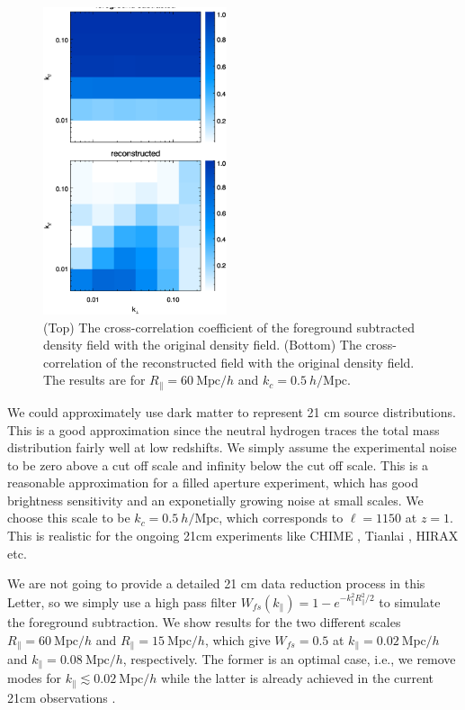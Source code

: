 \documentclass[aps,prl,twocolumn,showpacs,superscriptaddress,groupedaddress,nofootinbib,floatfix]{revtex4}  %
\newcommand{\mr}{\mathrm}
\begin{document}
\begin{figure}[tbp]
\begin{center}
\includegraphics[width=0.48\textwidth]{1.000cc2d.eps}
\end{center}
\vspace{-0.7cm}
\caption{(Top) The cross-correlation coefficient of the  
foreground subtracted density field with the original density field.
(Bottom) The cross-correlation of the reconstructed field with the original 
density field. 
The results are for $R_\parallel=60\ \mr{Mpc}/h$ and $k_c=0.5\ h/\mr{Mpc}$.}
\label{fig:ratio}
\end{figure}

We could approximately use dark matter to represent 21 cm source distributions.
This is a good approximation since the neutral hydrogen traces the total mass
distribution fairly well at low redshifts. We simply assume the experimental
noise to be zero above a cut off scale and infinity below the cut off scale.
This is a reasonable approximation for a filled aperture experiment, which
has good brightness sensitivity and an exponetially growing noise at small 
scales.
We choose this scale to be $k_c=0.5\ h/\mr{Mpc}$, which corresponds
to $\ell=1150$ at $z=1$. This is realistic for the ongoing 21cm experiments like
CHIME \cite{2014SPIE.9145E..22B}, Tianlai \cite{2015ApJ...798...40X}, 
HIRAX \cite{HIRAX} etc.

We are not going to provide a detailed 21 cm data reduction process in this 
Letter, so we simply  use a high pass filter 
$W_{fs}(k_\parallel)=1-e^{-k_\parallel^2R_\parallel^2/2}$ to simulate the 
foreground subtraction. We show results for the two different scales 
$R_\parallel=60\ \mr{Mpc}/h$ and $R_\parallel=15\ \mr{Mpc}/h$, which give
$W_{fs}=0.5$ at $k_\parallel=0.02\ \mr{Mpc}/h$ and 
$k_\parallel=0.08\ \mr{Mpc}/h$, respectively. The former is an optimal case, 
i.e., we remove modes for $k_\parallel\lesssim0.02\ \mr{Mpc}/h$ while the latter
is already achieved in the current 21cm observations 
\cite{2013ApJ...763L..20M,2013MNRAS.434L..46S}.
\end{document}
